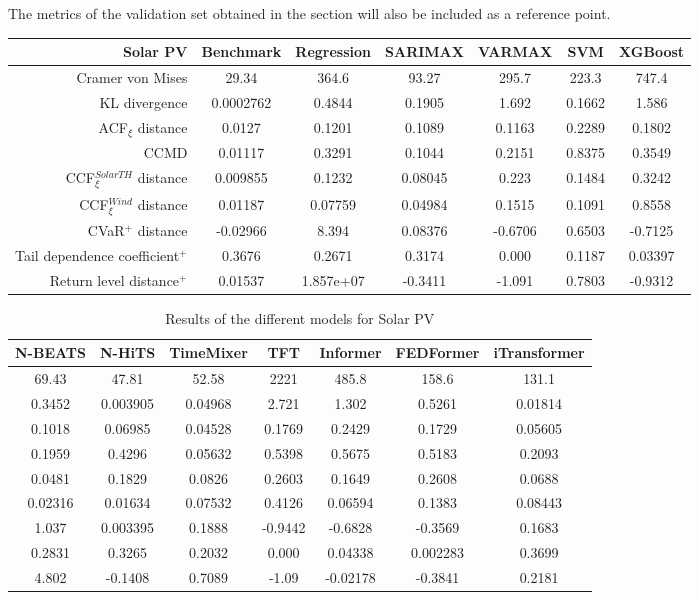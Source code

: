 The metrics of the validation set obtained in the  section will also be included as a reference point. 
\newpage
\begin{table}[ht]
    \footnotesize
    \begin{tabular}[l]{r|c|ccc|cc|}
        \toprule
        \textbf{Solar PV} &Benchmark&Regression&SARIMAX&VARMAX&SVM&XGBoost \\ 
        \midrule            
        Cramer von Mises&29.34&364.6&93.27&295.7&223.3&747.4 \\
        KL divergence&0.0002762&0.4844&0.1905&1.692&0.1662&1.586 \\
        ACF$_\xi$ distance&0.0127&0.1201&0.1089&0.1163&0.2289&0.1802 \\
        \midrule
        CCMD&0.01117&0.3291&0.1044&0.2151&0.8375&0.3549 \\
        CCF$_\xi^{Solar TH}$ distance&0.009855&0.1232&0.08045&0.223&0.1484&0.3242 \\
        CCF$_\xi^{Wind}$ distance&0.01187&0.07759&0.04984&0.1515&0.1091&0.8558 \\
        \midrule
        CVaR$^+$ distance&-0.02966&8.394&0.08376&-0.6706&0.6503&-0.7125 \\
        Tail dependence coefficient$^+$&0.3676&0.2671&0.3174&0.000&0.1187&0.03397 \\
        Return level distance$^+$&0.01537&1.857e+07&-0.3411&-1.091&0.7803&-0.9312 \\
        \bottomrule
    \end{tabular}
\end{table}
\begin{table}[ht]
    \footnotesize
    \begin{flushright}
    \begin{tabular}[r]{|ccc|cccc}
        \toprule
        N-BEATS&N-HiTS&TimeMixer&TFT&Informer&FEDFormer&iTransformer  \\
        \midrule            
        69.43&47.81&52.58&2221&485.8&158.6&131.1 \\
        0.3452&0.003905&0.04968&2.721&1.302&0.5261&0.01814 \\
        0.1018&0.06985&0.04528&0.1769&0.2429&0.1729&0.05605 \\
        \midrule
        0.1959&0.4296&0.05632&0.5398&0.5675&0.5183&0.2093 \\
        0.0481&0.1829&0.0826&0.2603&0.1649&0.2608&0.0688 \\
        0.02316&0.01634&0.07532&0.4126&0.06594&0.1383&0.08443 \\
        \midrule
        1.037&0.003395&0.1888&-0.9442&-0.6828&-0.3569&0.1683 \\
        0.2831&0.3265&0.2032&0.000&0.04338&0.002283&0.3699 \\
        4.802&-0.1408&0.7089&-1.09&-0.02178&-0.3841&0.2181 \\
        \bottomrule
    \end{tabular}
    \end{flushright}
    \caption{Results of the different models for Solar PV\label{long}}
    \label{table:results-solar-pv}
\end{table}

